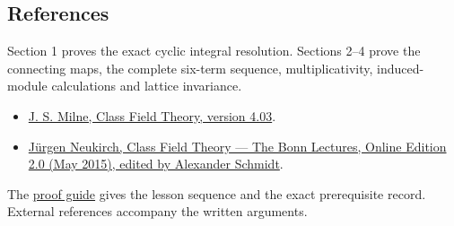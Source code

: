 \documentclass[11pt,a4paper]{article}
\newcommand{\tightlist}{\setlength{\itemsep}{0pt}\setlength{\parskip}{0pt}}
\begin{document}
\subsection{References}\label{references}

Section 1 proves the exact cyclic integral resolution. Sections 2--4
prove the connecting maps, the complete six-term sequence,
multiplicativity, induced-module calculations and lattice invariance.

\begin{itemize}
\tightlist
\item
  \href{https://www.jmilne.org/math/CourseNotes/CFT.pdf}{J. S. Milne,
  Class Field Theory, version 4.03}.
\item
  \href{https://www.mathi.uni-heidelberg.de/~schmidt/Neukirch-en/Neukirch_cft_02_may15.pdf}{Jürgen
  Neukirch, Class Field Theory --- The Bonn Lectures, Online Edition 2.0
  (May 2015), edited by Alexander Schmidt}.
\end{itemize}

The \href{../free-proofs.html}{proof guide} gives the lesson sequence
and the exact prerequisite record. External references accompany the
written arguments.
\end{document}
